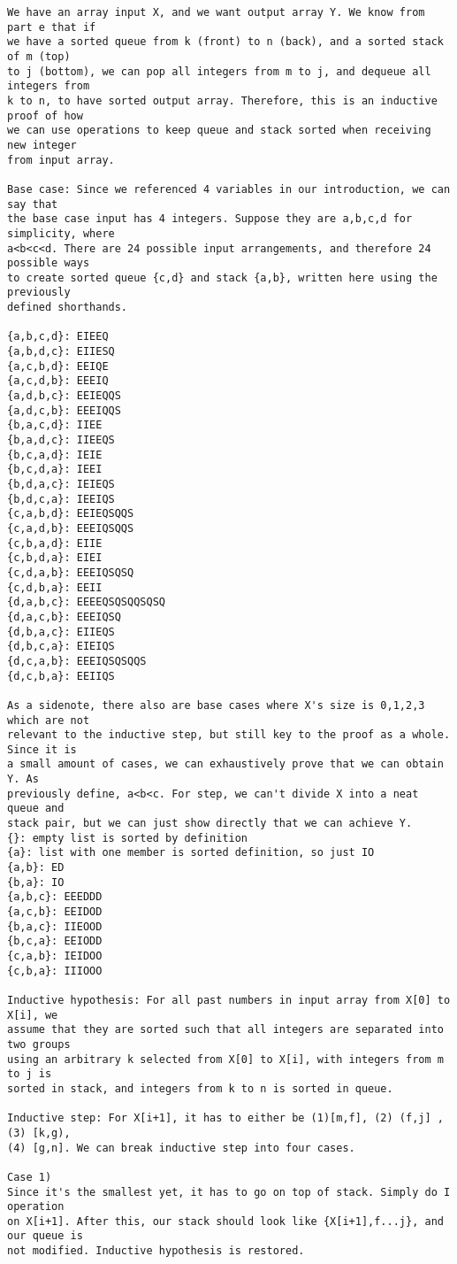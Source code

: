 \documentclass[11pt,table]{article}
\begin{document}
\begin{enumerate}
\begin{enumerate}[resume]
\begin{Verbatim}
We have an array input X, and we want output array Y. We know from part e that if 
we have a sorted queue from k (front) to n (back), and a sorted stack of m (top) 
to j (bottom), we can pop all integers from m to j, and dequeue all integers from 
k to n, to have sorted output array. Therefore, this is an inductive proof of how 
we can use operations to keep queue and stack sorted when receiving new integer 
from input array.

Base case: Since we referenced 4 variables in our introduction, we can say that 
the base case input has 4 integers. Suppose they are a,b,c,d for simplicity, where 
a<b<c<d. There are 24 possible input arrangements, and therefore 24 possible ways 
to create sorted queue {c,d} and stack {a,b}, written here using the previously 
defined shorthands.

{a,b,c,d}: EIEEQ
{a,b,d,c}: EIIESQ
{a,c,b,d}: EEIQE
{a,c,d,b}: EEEIQ
{a,d,b,c}: EEIEQQS
{a,d,c,b}: EEEIQQS
{b,a,c,d}: IIEE
{b,a,d,c}: IIEEQS
{b,c,a,d}: IEIE
{b,c,d,a}: IEEI
{b,d,a,c}: IEIEQS
{b,d,c,a}: IEEIQS
{c,a,b,d}: EEIEQSQQS
{c,a,d,b}: EEEIQSQQS
{c,b,a,d}: EIIE
{c,b,d,a}: EIEI
{c,d,a,b}: EEEIQSQSQ
{c,d,b,a}: EEII 
{d,a,b,c}: EEEEQSQSQQSQSQ
{d,a,c,b}: EEEIQSQ
{d,b,a,c}: EIIEQS
{d,b,c,a}: EIEIQS
{d,c,a,b}: EEEIQSQSQQS
{d,c,b,a}: EEIIQS

As a sidenote, there also are base cases where X's size is 0,1,2,3 which are not 
relevant to the inductive step, but still key to the proof as a whole. Since it is 
a small amount of cases, we can exhaustively prove that we can obtain Y. As 
previously define, a<b<c. For step, we can't divide X into a neat queue and 
stack pair, but we can just show directly that we can achieve Y.
{}: empty list is sorted by definition
{a}: list with one member is sorted definition, so just IO
{a,b}: ED
{b,a}: IO
{a,b,c}: EEEDDD
{a,c,b}: EEIDOD
{b,a,c}: IIEOOD
{b,c,a}: EEIODD
{c,a,b}: IEIDOO
{c,b,a}: IIIOOO

Inductive hypothesis: For all past numbers in input array from X[0] to X[i], we 
assume that they are sorted such that all integers are separated into two groups 
using an arbitrary k selected from X[0] to X[i], with integers from m to j is 
sorted in stack, and integers from k to n is sorted in queue.

Inductive step: For X[i+1], it has to either be (1)[m,f], (2) (f,j] , (3) [k,g), 
(4) [g,n]. We can break inductive step into four cases.

Case 1) 
Since it's the smallest yet, it has to go on top of stack. Simply do I operation 
on X[i+1]. After this, our stack should look like {X[i+1],f...j}, and our queue is
not modified. Inductive hypothesis is restored.


\end{Verbatim}
\end{enumerate}
\end{enumerate}
\end{document}
